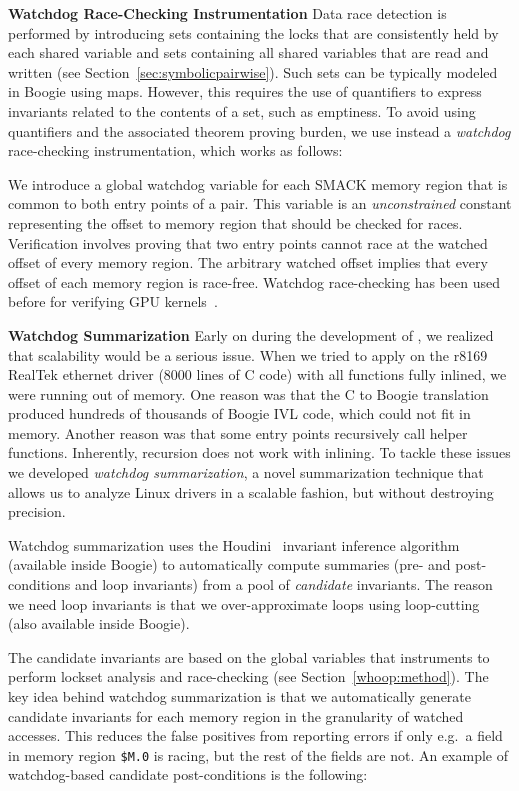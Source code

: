 \medskip\noindent\textbf{Watchdog Race-Checking Instrumentation }
%
Data race detection is performed by introducing sets containing the locks that are consistently held by each shared variable and sets containing all shared variables that are read and written (see Section~\ref{sec:symbolicpairwise}). Such sets can be typically modeled in Boogie using maps. However, this requires the use of quantifiers to express invariants related to the contents of a set, such as emptiness. To avoid using quantifiers and the associated theorem proving burden, we use instead a \emph{watchdog} race-checking instrumentation, which works as follows:

We introduce a global watchdog variable for each SMACK memory region that is common to both entry points of a pair. This variable is an \emph{unconstrained} constant representing the offset to memory region that should be checked for races. Verification involves proving that two entry points cannot race at the watched offset of every memory region. The arbitrary watched offset implies that every offset of each memory region is race-free. Watchdog race-checking has been used before for verifying GPU kernels~\cite{bardsley2014engineering}.


\medskip\noindent\textbf{Watchdog Summarization }
%
Early on during the development of \whoop, we realized that scalability would be a serious issue. When we tried to apply \whoop on the r8169 RealTek ethernet driver (8000 lines of C code) with all functions fully inlined, we were running out of memory. One reason was that the C to Boogie translation produced hundreds of thousands of Boogie IVL code, which could not fit in memory. Another reason was that some entry points recursively call helper functions. Inherently, recursion does not work with inlining. To tackle these issues we developed \emph{watchdog summarization}, a novel summarization technique that allows us to analyze Linux drivers in a scalable fashion, but without destroying precision.

Watchdog summarization uses the Houdini~\cite{flanagan2001houdini} invariant inference algorithm (available inside Boogie) to automatically compute summaries (pre- and post-conditions and loop invariants) from a pool of \emph{candidate} invariants. The reason we need loop invariants is that we over-approximate loops using loop-cutting (also available inside Boogie).

The candidate invariants are based on the global variables that \whoop instruments to perform lockset analysis and race-checking (see Section~\ref{whoop:method}). The key idea behind watchdog summarization is that we automatically generate candidate invariants for each memory region in the granularity of watched accesses. This reduces the false positives from reporting errors if only e.g.\ a field in memory region \texttt{\$M.0} is racing, but the rest of the fields are not. An example of watchdog-based candidate post-conditions is the following:

